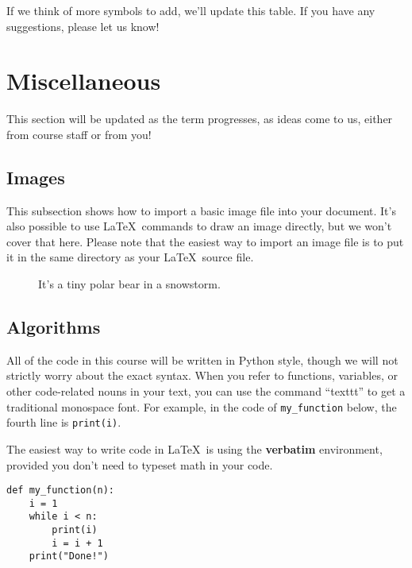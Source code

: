 \documentclass[12pt]{article}
\begin{document}
\vspace{5pt}

If we think of more symbols to add, we'll update this table.
If you have any suggestions, please let us know!
\newpage


\section{Miscellaneous}
This section will be updated as the term progresses, as ideas come to us, either from course staff or from you!

\subsection{Images}
This subsection shows how to import a basic image file into your document.
It's also possible to use \LaTeX\ commands to draw an image directly,
but we won't cover that here.
Please note that the easiest way to import an image file is to put it in the same directory as your \LaTeX\ source file.

\begin{figure}[h]
\centering   %
\caption{It's a tiny polar bear in a snowstorm.}
\end{figure}


\subsection{Algorithms}
All of the code in this course will be written in Python style, though we will not strictly worry about the exact syntax.
When you refer to functions, variables, or other code-related nouns in your text, you can use the command ``texttt'' to get a traditional monospace font.
For example, in the code of \texttt{my\_function} below, the fourth line is \texttt{print(i)}. %

The easiest way to write code in \LaTeX\ is using the \textbf{verbatim} environment, provided you don't need to typeset math in your code.

\begin{verbatim}
def my_function(n):
    i = 1
    while i < n:
        print(i)
        i = i + 1
    print("Done!")
\end{verbatim}
\newpage
\end{document}
